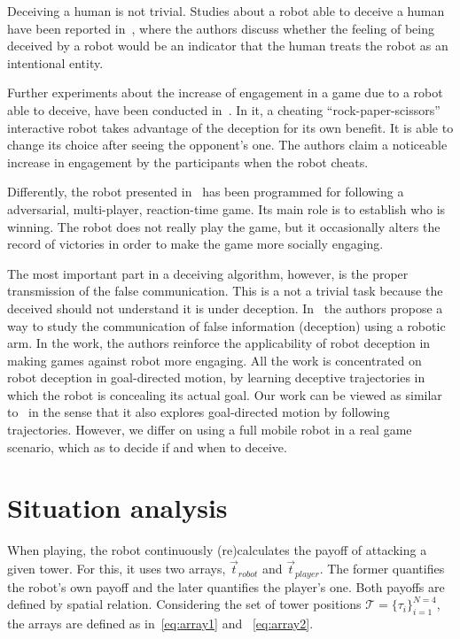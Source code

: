 Deceiving a human is not trivial. Studies about a robot able to deceive a human have been reported in~\cite{terada_can_2010}, where the authors discuss whether the feeling of being deceived by a robot would be an indicator that the human treats the robot as an intentional entity. 

Further experiments about the increase of engagement in a game due to a robot able to deceive, have been conducted in~\cite{short_no_2010}. In it, a cheating ``rock-paper-scissors'' interactive robot takes advantage of the deception for its own benefit. It is able to change its choice after seeing the opponent's one. The authors claim a noticeable increase in engagement by the participants when the robot cheats.

Differently, the robot presented in~\cite{vazquez_deceptive_2011} has been programmed for following a adversarial, multi-player, reaction-time game. Its main role is to establish who is winning. The robot does not really play the game, but it occasionally alters the record of victories in order to make the game more socially engaging.

The most important part in a deceiving algorithm, however, is the proper transmission of the false communication. This is a not a trivial task because the deceived should not understand it is under deception. In~\cite{dragan_analysis_2014} the authors propose a way to study the communication of false information (deception) using a robotic arm. In the work, the authors reinforce the applicability of robot deception in making games against robot more engaging. All the work is concentrated on robot deception in goal-directed motion, by learning deceptive trajectories in which the robot is concealing its actual goal. Our work can be viewed as similar to~\cite{dragan_analysis_2014} in the sense that it also explores goal-directed motion by following trajectories. However, we differ on using a full mobile robot in a real game scenario, which as to decide if and when to deceive. 

\section{Situation analysis}\label{sec:deception_detecting_it}
When playing, the robot continuously (re)calculates the payoff of attacking a given tower. For this, it uses two arrays, $\overrightarrow{t}_{robot}$ and $\overrightarrow{t}_{player}$. The former quantifies the robot's own payoff and the later quantifies the player's one. Both payoffs are defined by spatial relation. Considering the set of tower positions $\mathcal{T} = \{\tau_{i}\}_{i=1}^{N=4}$, the arrays are defined as in~\ref{eq:array1} and ~\ref{eq:array2}.

